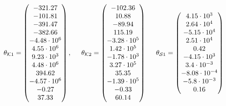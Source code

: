 \vspace{-2mm}

 \begin{equation}
\label{par_matrices_output_example123}
         \theta_{\mathcal{K}1} = 
          \begin{pmatrix}
           -321.27  \\
           -101.81  \\
           -391.47  \\
           -382.66  \\
           -4.48 \cdot 10^6  \\
           4.55 \cdot 10^6 \\
           9.23 \cdot 10^3 \\
           4.48 \cdot 10^6 \\
           394.62 \\
           -4.57 \cdot 10^6\\
           -0.27 \\
           37.33 \\
         \end{pmatrix}
         ,
         \hspace{5mm}
         \theta_{\mathcal{K}2} = 
          \begin{pmatrix}
           -102.36  \\
           10.88  \\
           -89.94  \\
           115.19  \\
           -3.28 \cdot 10^5  \\
           1.42 \cdot 10^5 \\
           -1.78 \cdot 10^3 \\
           3.27 \cdot 10^5 \\
           35.35 \\
           -1.39 \cdot 10^5\\
           -0.33 \\
           60.14 \\
         \end{pmatrix}
\hspace{5mm}
         \theta_{\mathcal{S}1} = 
          \begin{pmatrix}
           4.15 \cdot 10^{3} \\
            2.64 \cdot 10^{4} \\
             -5.15 \cdot 10^{4} \\
              2.51 \cdot 10^{4} \\
               0.42 \\
                -4.15 \cdot 10^{3} \\
                  3.4 \cdot 10^{-3} \\
                   -8.08 \cdot 10^{-4} \\
                   -5.8 \cdot 10^{-3} \\
                    0.16 

         \end{pmatrix}
\end{equation}

